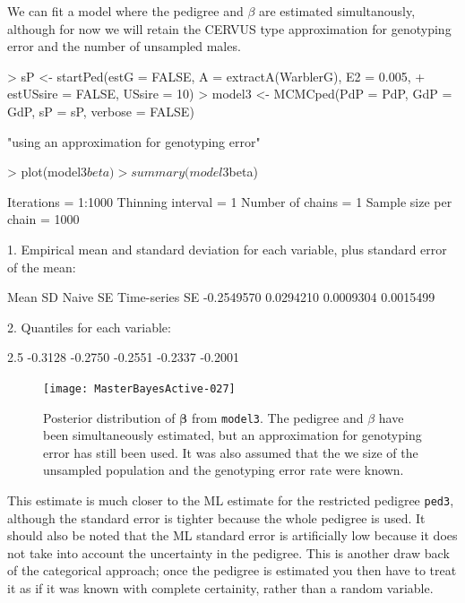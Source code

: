 \documentclass{article}
\begin{document}
  We can fit a model where the pedigree and $\beta$ are estimated simultanously, although for now we will retain the CERVUS type approximation for genotyping error and the number of unsampled males.

\begin{Schunk}
\begin{Sinput}
> sP <- startPed(estG = FALSE, A = extractA(WarblerG), E2 = 0.005, 
+     estUSsire = FALSE, USsire = 10)
> model3 <- MCMCped(PdP = PdP, GdP = GdP, sP = sP, verbose = FALSE)
\end{Sinput}
\begin{Soutput}
[1] "using an approximation for genotyping error"
\end{Soutput}
\begin{Sinput}
> plot(model3$beta)
> summary(model3$beta)
\end{Sinput}
\begin{Soutput}
Iterations = 1:1000
Thinning interval = 1 
Number of chains = 1 
Sample size per chain = 1000 

1. Empirical mean and standard deviation for each variable,
   plus standard error of the mean:

          Mean             SD       Naive SE Time-series SE 
    -0.2549570      0.0294210      0.0009304      0.0015499 

2. Quantiles for each variable:

   2.5%
-0.3128 -0.2750 -0.2551 -0.2337 -0.2001 
\end{Soutput}
\end{Schunk}
 


\begin{figure}[!h]
\begin{center}
\texttt{[image: MasterBayesActive-027]}
\end{center}
\caption{Posterior distribution of $\bm{\beta}$ from \texttt{model3}. The pedigree and $\beta$ have been simultaneously estimated, but an approximation for genotyping error has still been used. It was also assumed that the we size of the unsampled population and the genotyping error rate were known.}
\label{model3beta-fig}
\end{figure}


This estimate is much closer to the ML estimate for the restricted pedigree \texttt{ped3}, although the standard error is tighter because the whole pedigree is used.  It should also be noted that the ML standard error is artificially low because it does not take into account the uncertainty in the pedigree.  This is another draw back of the categorical approach; once the pedigree is estimated you then have to treat it as if it was known with complete certainity, rather than a random variable. \\
\end{document}
